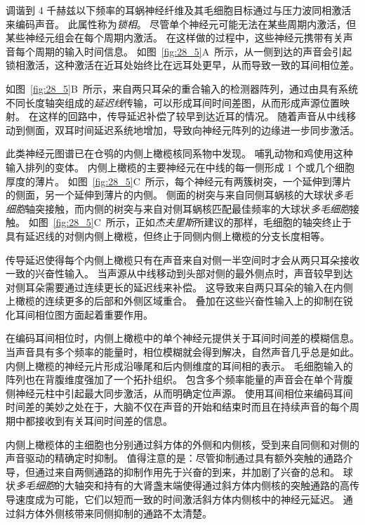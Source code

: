 调谐到 4 千赫兹以下频率的耳蜗神经纤维及其毛细胞目标通过与压力波同相激活来编码声音。
此属性称为\textit{锁相}。
尽管单个神经元可能无法在某些周期内激活，但某些神经元组会在每个周期内激活。
在这样做的过程中，这些神经元携带有关声音每个周期的输入时间信息。 
如图~\ref{fig:28_5}A~所示，从一侧到达的声音会引起锁相激活，这种激活在近耳处始终比在远耳处更早，从而导致一致的耳间相位差。


如图~\ref{fig:28_5}B~所示，来自两只耳朵的重合输入的检测器阵列，通过由具有系统不同长度轴突组成的\textit{延迟线}传输，可以形成耳间时间差图，从而形成声源位置映射\cite{jeffress1948place}。
在这样的回路中，传导延迟补偿了较早到达近耳的情况。
随着声音从中线移动到侧面，双耳时间延迟系统地增加，导致向神经元阵列的边缘进一步同步激活。


此类神经元图谱已在仓鸮的内侧上橄榄核同系物中发现。
哺乳动物和鸡使用这种输入排列的变体。
内侧上橄榄的主要神经元在中线的每一侧形成 1 个或几个细胞厚度的薄片。
如图~\ref{fig:28_5}C~所示，每个神经元有两簇树突，一个延伸到薄片的侧面，另一个延伸到薄片的内侧。
侧面的树突与来自同侧耳蜗核的大球状\textit{多毛细胞}轴突接触，而内侧的树突与来自对侧耳蜗核匹配最佳频率的大球状\textit{多毛细胞}接触。
如图~\ref{fig:28_5}C~所示，正如\textit{杰夫里斯}所建议的那样，毛细胞的轴突终止于具有延迟线的对侧内侧上橄榄，但终止于同侧内侧上橄榄的分支长度相等。


传导延迟使得每个内侧上橄榄只有在声音来自对侧一半空间时才会从两只耳朵接收一致的兴奋性输入。
当声源从中线移动到头部对侧的最外侧点时，声音较早到达对侧耳朵需要通过连续更长的延迟线来补偿。
这导致来自两只耳朵的输入在内侧上橄榄的连续更多的后部和外侧区域重合。
叠加在这些兴奋性输入上的抑制在锐化耳间相位图方面起着重要作用。


在编码耳间相位时，内侧上橄榄中的单个神经元提供关于耳间时间差的模糊信息。
当声音具有多个频率的能量时，相位模糊就会得到解决，自然声音几乎总是如此。
内侧上橄榄的神经元片形成沿喙尾和后内侧维度的耳间相的表示。
毛细胞输入的阵列也在背腹维度强加了一个拓扑组织。
包含多个频率能量的声音会在单个背腹侧神经元柱中引起最大同步激活，从而明确定位声源。
使用耳间相位来编码耳间时间差的美妙之处在于，大脑不仅在声音的开始和结束时而且在持续声音的每个周期中都接收到有关耳间时间差的信息。


内侧上橄榄体的主细胞也分别通过斜方体的外侧和内侧核，受到来自同侧和对侧的声音驱动的精确定时抑制。
值得注意的是：尽管抑制通过具有额外突触的通路介导，但通过来自两侧通路的抑制作用先于兴奋的到来，并加剧了兴奋的总和。
球状\textit{多毛细胞}的大轴突和持有的大肾盏末端使得通过斜方体内侧核的突触通路的高传导速度成为可能，它们以短而一致的时间激活斜方体内侧核中的神经元延迟。
通过斜方体外侧核带来同侧抑制的通路不太清楚。


